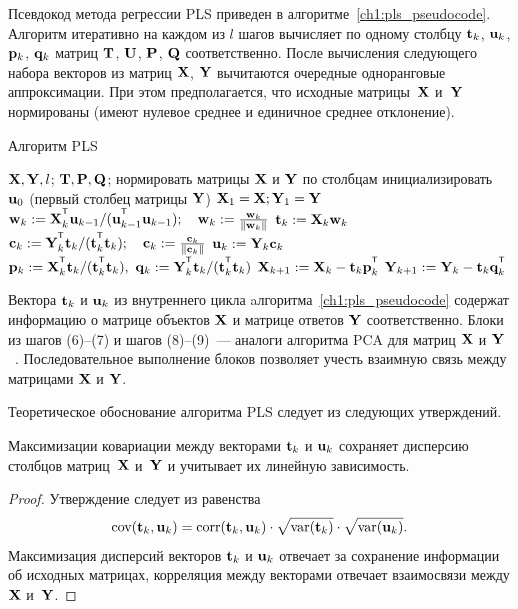 Псевдокод метода регрессии PLS приведен в алгоритме~\ref{ch1:pls_pseudocode}.
Алгоритм итеративно на каждом из $l$ шагов вычисляет по одному столбцу $\mathbf{t}_k$, $\mathbf{u}_k$, $\mathbf{p}_k$, $\mathbf{q}_k$ матриц $\mathbf{T}$, $\mathbf{U}$, $\mathbf{P}$, $\mathbf{Q}$ соответственно. 
После вычисления следующего набора векторов из матриц $\mathbf{X}$, $\mathbf{Y}$ вычитаются очередные одноранговые аппроксимации. 
При этом предполагается, что исходные матрицы~$\mathbf{X}$ и~$\mathbf{Y}$ нормированы (имеют нулевое среднее и единичное среднее отклонение).

\begin{algorithm}[h]
	\caption{Алгоритм PLS}
	\label{ch1:pls_pseudocode}
	\begin{algorithmic}[1]
		\REQUIRE $\mathbf{X}, \mathbf{Y}, l$;
		\ENSURE $\mathbf{T}, \mathbf{P}, \mathbf{Q}$;
		\STATE нормировать матрицы $\mathbf{X}$ и $\mathbf{Y}$ по столбцам
		\STATE инициализировать $\mathbf{u}_0$ (первый столбец матрицы $\mathbf{Y}$)
		\STATE $\mathbf{X}_1 = \mathbf{X}; \mathbf{Y}_1 = \mathbf{Y}$
		\REPEAT
		\vspace{0.1cm}
		\STATE $\bw_k := \bX_k^{\T} \bu_{k-1} / (\bu_{k-1}^{\T} \bu_{k-1}); \quad \bw_k: = \frac{\bw_k}{\| \bw_k \|}$
		\vspace{0.1cm}
		\STATE $\mathbf{t}_k := \mathbf{X}_k \mathbf{w}_k$
		\vspace{0.1cm}
		\STATE $\bc_k := \bY_k^{\T} \bt_k / (\bt_k^{\T} \bt_k); \quad \bc_k: = \frac{\bc_k}{\| \bc_k \|}$
		\vspace{0.1cm}
		\STATE $\mathbf{u}_k := \mathbf{Y}_k \mathbf{c}_k$
		\vspace{0.1cm}
		\STATE $\bp_k:= \bX_k^{\T}\bt_k/(\bt_k^{\T}\bt_k),\ 
		\bq_k := \bY_k^{\T}\bt_k/(\bt_k^{\T}\bt_k)$
		\vspace{0.2cm}
		\STATE $\bX_{k+1} :=  \bX_k - \bt_k \bp_k^{\T}$
		\vspace{0.2cm}
		\STATE $\bY_{k + 1} :=  \bY_k - \bt_k \bq_k^{\T}$ 
		\ENDFOR
	\end{algorithmic}
\end{algorithm}

Вектора $\mathbf{t}_k$ и $\mathbf{u}_k$ из внутреннего цикла aлгоритма~\ref{ch1:pls_pseudocode}
содержат информацию о матрице объектов $\mathbf{X}$ и матрице ответов $\mathbf{Y}$ соответственно. 
Блоки из шагов (6)--(7) и шагов (8)--(9)~--- аналоги алгоритма PCA для матриц $\mathbf{X}$ и $\mathbf{Y}$~\cite{geladi1988pls}. 
Последовательное выполнение блоков позволяет учесть взаимную связь между матрицами $\mathbf{X}$ и $\mathbf{Y}$.

Теоретическое обоснование алгоритма PLS следует из следующих утверждений.
\begin{statement}
	Максимизации ковариации между векторами $\mathbf{t}_k$ и $\mathbf{u}_k$ сохраняет дисперсию столбцов матриц~$\mathbf{X}$ и~$\mathbf{Y}$ и учитывает их линейную зависимость.
\end{statement}
\begin{proof}
	Утверждение следует из равенства
	\[
	\text{cov} (\mathbf{t}_k, \mathbf{u}_k) = \text{corr} (\mathbf{t}_k, \mathbf{u}_k) \cdot \sqrt{\text{var}(\mathbf{t}_k)} \cdot \sqrt{\text{var}(\mathbf{u}_k)}.
	\]
	Максимизация дисперсий векторов $\mathbf{t}_k$ и $\mathbf{u}_k$ отвечает за сохранение информации об исходных матрицах, 
	корреляция между векторами отвечает взаимосвязи между $\mathbf{X}$ и~$\mathbf{Y}$. 
\end{proof}

